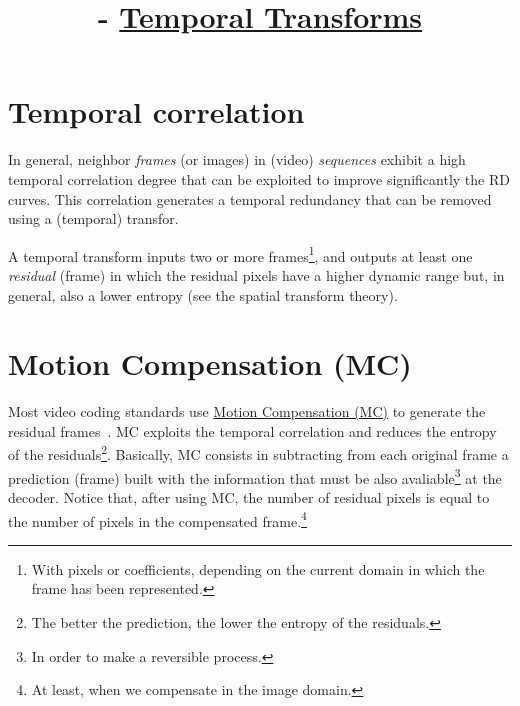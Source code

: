 


\title{\SM{} - \href{https://github.com/Sistemas-Multimedia/Sistemas-Multimedia.github.io/tree/master/contents/temporal_transforms}{Temporal Transforms}}

\maketitle
\tableofcontents

\section{Temporal correlation}

In general, neighbor \emph{frames} (or images) in (video)
\emph{sequences} exhibit a high temporal correlation degree that can
be exploited to improve significantly the RD curves. This correlation
generates a temporal redundancy that can be removed using a (temporal)
transfor.

A temporal transform inputs two or more frames\footnote{With pixels or
  coefficients, depending on the current domain in which the frame has
  been represented.}, and outputs at least one \emph{residual} (frame)
in which the residual pixels have a higher dynamic range but, in
general, also a lower entropy (see the spatial transform theory).


\section{Motion Compensation (MC)}

Most video coding standards use
\href{https://en.wikipedia.org/wiki/Motion_compensation}{Motion
  Compensation (MC)} to generate the residual
frames~\cite{vruiz__MC}. MC exploits the temporal correlation and
reduces the entropy of the residuals\footnote{The better the
  prediction, the lower the entropy of the residuals.}. Basically, MC
consists in subtracting from each original frame a prediction (frame)
built with the information that must be also avaliable\footnote{In
  order to make a reversible process.} at the decoder. Notice that,
after using MC, the number of residual pixels is equal to the number
of pixels in the compensated frame.\footnote{At least, when we
  compensate in the image domain.}

